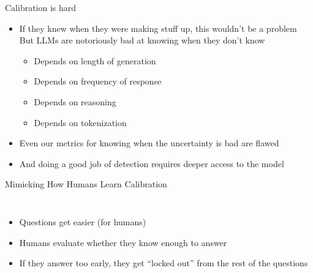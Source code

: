 \documentclass[compress]{beamer}
\begin{document}
\begin{frame}{Calibration is hard}
	
	\begin{itemize}
		\item If they knew when they were making stuff up, this wouldn’t be a problem
		But LLMs are notoriously bad at knowing when they don’t know
		\begin{itemize}
			\item Depends on length of generation
			\item Depends on frequency of response
			\item Depends on reasoning
			\item Depends on tokenization 
		\end{itemize}
		\item Even our metrics for knowing when the uncertainty is bad are flawed
		\item And doing a good job of detection requires deeper access to the model
	\end{itemize}
\end{frame}

\begin{frame}{Mimicking How Humans Learn Calibration}
	\begin{columns}
		\begin{itemize}
			\item Questions get easier
			(for humans)
			\item Humans evaluate whether they know enough to answer
			\item If they answer too early, they get “locked out” from the rest of the questions
			
		\end{itemize}
		
	\end{columns}
	
\end{frame}
\end{document}
